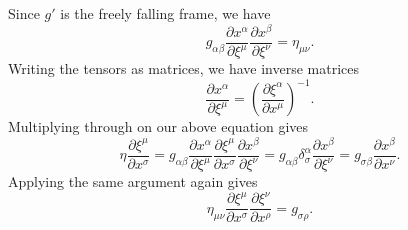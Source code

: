 Since $g'$ is the freely falling frame, we have
\[
	g_{\alpha \beta } \frac{\partial x^\alpha }{\partial \xi ^\mu } \frac{\partial x^\beta }{\partial \xi ^\nu } =\eta _{\mu \nu } 
.\]
Writing the tensors as matrices, we have inverse matrices
\[
	\frac{\partial x^\alpha }{\partial \xi ^\mu } =\left( \frac{\partial \xi ^\alpha }{\partial x^\mu }  \right) ^{-1} 
.\]
Multiplying through on our above equation gives
\[
	\eta \frac{\partial \xi ^\mu }{\partial x^\sigma } =g_{\alpha \beta } \frac{\partial x^\alpha }{\partial \xi ^\mu } \frac{\partial \xi ^\mu }{\partial x^\sigma } \frac{\partial x^\beta }{\partial \xi ^\nu } =g_{\alpha \beta } \delta _\sigma ^\alpha \frac{\partial x^\beta }{\partial \xi ^\nu } =g_{\sigma \beta } \frac{\partial x^\beta }{\partial x^\nu } 
.\]
Applying the same argument again gives
\[
	\eta _{\mu \nu } \frac{\partial \xi ^\mu }{\partial x^\sigma } \frac{\partial \xi ^\nu }{\partial x^\rho } =g_{\sigma \rho } 
.\]

